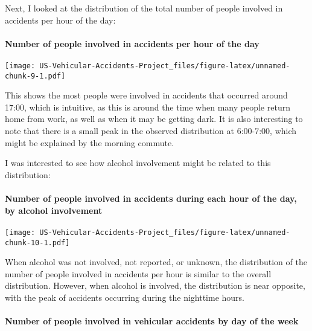 \documentclass[]{article}
\let\oldparagraph\paragraph
\renewcommand{\paragraph}[1]{\oldparagraph{#1}\mbox{}}
\begin{document}
Next, I looked at the distribution of the total number of people
involved in accidents per hour of the day:

\hypertarget{number-of-people-involved-in-accidents-per-hour-of-the-day}{%
\paragraph{Number of people involved in accidents per hour of the
day}\label{number-of-people-involved-in-accidents-per-hour-of-the-day}}

\texttt{[image: US-Vehicular-Accidents-Project\_files/figure-latex/unnamed-chunk-9-1.pdf]}

This shows the most people were involved in accidents that occurred
around 17:00, which is intuitive, as this is around the time when many
people return home from work, as well as when it may be getting dark. It
is also interesting to note that there is a small peak in the observed
distribution at 6:00-7:00, which might be explained by the morning
commute.

I was interested to see how alcohol involvement might be related to this
distribution:

\hypertarget{number-of-people-involved-in-accidents-during-each-hour-of-the-day-by-alcohol-involvement}{%
\paragraph{Number of people involved in accidents during each hour of
the day, by alcohol
involvement}\label{number-of-people-involved-in-accidents-during-each-hour-of-the-day-by-alcohol-involvement}}

\texttt{[image: US-Vehicular-Accidents-Project\_files/figure-latex/unnamed-chunk-10-1.pdf]}

When alcohol was not involved, not reported, or unknown, the
distribution of the number of people involved in accidents per hour is
similar to the overall distribution. However, when alcohol is involved,
the distribution is near opposite, with the peak of accidents occurring
during the nighttime hours.

\hypertarget{number-of-people-involved-in-vehicular-accidents-by-day-of-the-week}{%
\paragraph{Number of people involved in vehicular accidents by day of
the
week}\label{number-of-people-involved-in-vehicular-accidents-by-day-of-the-week}}
\end{document}
